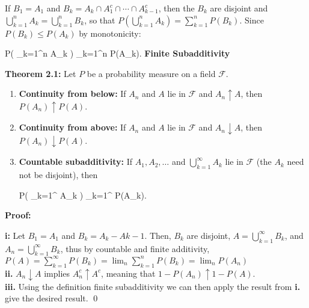 	      		If $B_1 = A_1$ and $B_k = A_k \cap A_1^c \cap \cdots \cap A_{k-1}^c$, then the $B_k$ are disjoint and\\[5pt]
	      		$\bigcup_{k=1}^{n} A_k = \bigcup_{k=1}^{n} B_k$, so that
	      		$P\left( \bigcup_{k=1}^{n} A_k \right) = \sum_{k=1}^{n} P(B_k)$.
	      		Since $P(B_k) \leq P(A_k)$ by monotonicity:
	      		\begin{UNequation}
	      			P\left( \bigcup_{k=1}^{n} A_k \right) \leq \sum_{k=1}^{n} P(A_k). \quad \quad \textbf{\scriptsize Finite Subadditivity}
	      		\end{UNequation}

	      		\textbf{Theorem 2.1: }Let $P$ be a probability measure on a field $\mathcal{F}$.
	      		\begin{enumerate}[label=\textbf{\roman*.}, topsep=0pt, itemsep=-3pt]
	      			\item \textbf{Continuity from below:} If $A_n$ and $A$ lie in $\mathcal{F}$ and $A_n \uparrow A$, then $P(A_n) \uparrow P(A).$
	      			\item \textbf{Continuity from above:} If $A_n$ and $A$ lie in $\mathcal{F}$ and $A_n \downarrow A$, then $P(A_n) \downarrow P(A)$.
	      			\item \textbf{Countable subadditivity:} If $A_1, A_2, \dots$ and $\bigcup_{k=1}^{\infty} A_k$ lie in $\mathcal{F}$ (the $A_k$ need not be disjoint), then
	      			      \begin{UNequation}
	      			      	P\left( \bigcup_{k=1}^{\infty} A_k \right) \leq \sum_{k=1}^{\infty} P(A_k).
	      			      \end{UNequation}
	      		\end{enumerate}
	      		\vspace{-6ex}
	      		\textbf{Proof:}
	      		\begin{proofline}
	      			\textbf{i:} Let $B_1=A_1$ and $B_k=A_k-A{k-1}$. Then, $B_k$ are disjoint, $A=\bigcup_{k=1}^{\infty}B_k$, and $A_n=\bigcup_{k=1}^{\infty}B_k$, thus by countable and finite additivity, $P(A)=\sum_{k=1}^{\infty}P(B_k)=\lim_n \sum_{k=1}^{n}P(B_k)=\lim_n P(A_n)$\\
	      			\textbf{ii.} $A_n \downarrow A$ implies $A_n^c \uparrow A^c$, meaning that $1-P(A_n)\uparrow 1 - P(A)$.\\
	      			\textbf{iii. } Using the definition finite subadditivity we can then apply the result from \textbf{i.} give the desired result. \hfill \qed 
	      		\end{proofline}
	      		

